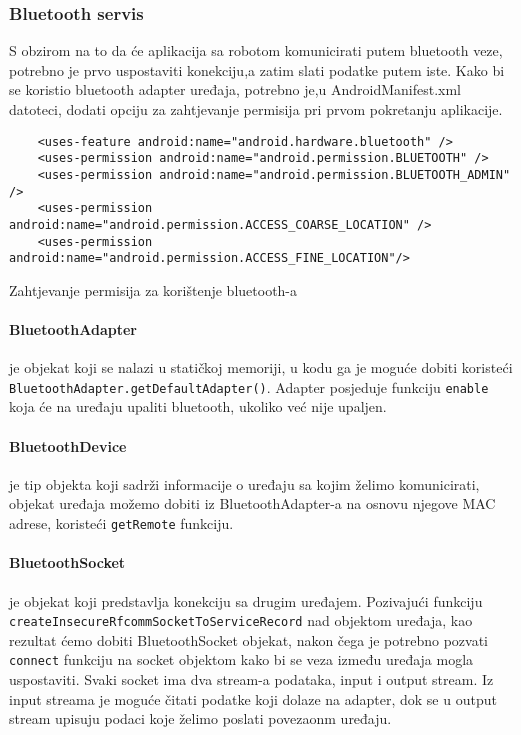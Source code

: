 \documentclass[../Document.tex]{subfiles}
\begin{document}
\subsubsection{Bluetooth servis}
S obzirom na to da će aplikacija sa robotom komunicirati putem bluetooth veze, potrebno je prvo uspostaviti konekciju,a zatim slati podatke putem iste. Kako bi se koristio bluetooth adapter uređaja, potrebno je,u AndroidManifest.xml datoteci, dodati opciju za zahtjevanje permisija pri prvom pokretanju aplikacije.

\begin{code}
    \begin{verbatim}
    <uses-feature android:name="android.hardware.bluetooth" />
    <uses-permission android:name="android.permission.BLUETOOTH" />
    <uses-permission android:name="android.permission.BLUETOOTH_ADMIN" />
    <uses-permission android:name="android.permission.ACCESS_COARSE_LOCATION" />
    <uses-permission android:name="android.permission.ACCESS_FINE_LOCATION"/>
    \end{verbatim}
    \caption{Zahtjevanje permisija za korištenje bluetooth-a}
\end{code}

\paragraph{BluetoothAdapter} je objekat koji se nalazi u statičkoj memoriji, u kodu ga je moguće dobiti koristeći \verb|BluetoothAdapter.getDefaultAdapter()|. Adapter posjeduje funkciju \verb|enable| koja će na uređaju upaliti bluetooth, ukoliko već nije upaljen.

\paragraph{BluetoothDevice} je tip objekta koji sadrži informacije o uređaju sa kojim želimo komunicirati, objekat uređaja možemo dobiti iz BluetoothAdapter-a na osnovu njegove MAC adrese, koristeći \verb|getRemote| funkciju.

\paragraph{BluetoothSocket} je objekat koji predstavlja konekciju sa drugim uređajem. Pozivajući funkciju \verb|createInsecureRfcommSocketToServiceRecord| nad objektom uređaja, kao rezultat ćemo dobiti BluetoothSocket objekat, nakon čega je potrebno pozvati \verb|connect| funkciju na socket objektom kako bi se veza između uređaja mogla uspostaviti. Svaki socket ima dva stream-a podataka, input i output stream. Iz input streama je moguće čitati podatke koji dolaze na adapter, dok se u output stream upisuju podaci koje želimo poslati povezaonm uređaju.
\end{document}
